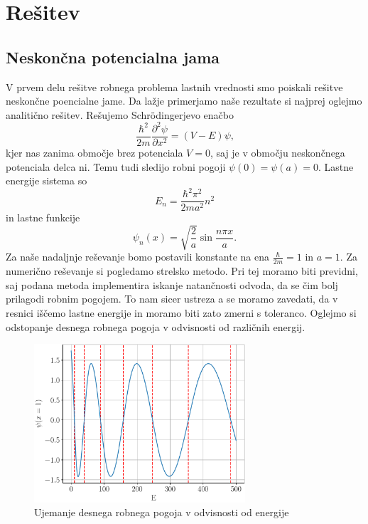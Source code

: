\documentclass{article}
\begin{document}
\section{Rešitev}
\subsection{Neskončna potencialna jama}
V prvem delu rešitve robnega problema lastnih vrednosti smo poiskali rešitve neskončne poencialne jame. Da lažje primerjamo naše rezultate si najprej oglejmo analitično rešitev. Rešujemo Schr{\"o}dingerjevo enačbo
\begin{equation}
	\frac{\hbar^2}{2m}\frac{\partial^2\psi}{\partial x^2} = (V - E)\psi\text{,}
\end{equation}
kjer nas zanima območje brez potenciala $V=0$, saj je v območju neskončnega potenciala delca ni. Temu tudi sledijo robni pogoji $\psi(0)=\psi(a)=0$. Lastne energije sistema so
\begin{equation}
	E_n=\frac{\hbar^2\pi^2}{2ma^2}n^2
\end{equation}
in lastne funkcije
\begin{equation}
	\psi_n(x)=\sqrt{\frac{2}{a}}\sin{\frac{n\pi x}{a}}\text{.}
\end{equation}
Za naše nadaljnje reševanje bomo postavili konstante na ena $\frac{\hbar}{2m}=1$ in $a=1$. Za numerično reševanje si pogledamo strelsko metodo. Pri tej moramo biti previdni, saj podana metoda implementira iskanje natančnosti odvoda, da se čim bolj prilagodi robnim pogojem. To nam sicer ustreza a se moramo zavedati, da v resnici iščemo lastne energije in moramo biti zato zmerni s toleranco. 
Oglejmo si odstopanje desnega robnega pogoja v odvisnosti od različnih energij.
\begin{figure}[H]
	\centering
	\includegraphics[width=0.7\textwidth]{diff.pdf}
	\caption{Ujemanje desnega robnega pogoja v odvisnosti od energije}
\end{figure}
\end{document}
